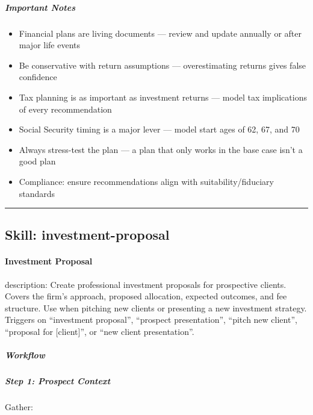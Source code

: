 \documentclass[11pt]{article}
\begin{document}
\subparagraph{Important Notes}\mbox{}\par

\begin{itemize}[leftmargin=*,itemsep=2pt,topsep=2pt]
\item {} Financial plans are living documents — review and update annually or after major life events
\item {} Be conservative with return assumptions — overestimating returns gives false confidence
\item {} Tax planning is as important as investment returns — model tax implications of every recommendation
\item {} Social Security timing is a major lever — model start ages of 62, 67, and 70
\item {} Always stress-test the plan — a plan that only works in the base case isn't a good plan
\item {} Compliance: ensure recommendations align with suitability/fiduciary standards
\end{itemize}

\vspace{0.8em}\hrule\vspace{0.8em}

\subsection{Skill: investment-proposal}\label{file:skills-investment-proposal-SKILL.md}

\paragraph{Investment Proposal}\mbox{}\par

description: Create professional investment proposals for prospective clients. Covers the firm's approach, proposed allocation, expected outcomes, and fee structure. Use when pitching new clients or presenting a new investment strategy. Triggers on ``investment proposal'', ``prospect presentation'', ``pitch new client'', ``proposal for [client]'', or ``new client presentation''.


\subparagraph{Workflow}\mbox{}\par

\subparagraph{Step 1: Prospect Context}\mbox{}\par

Gather:
\end{document}

